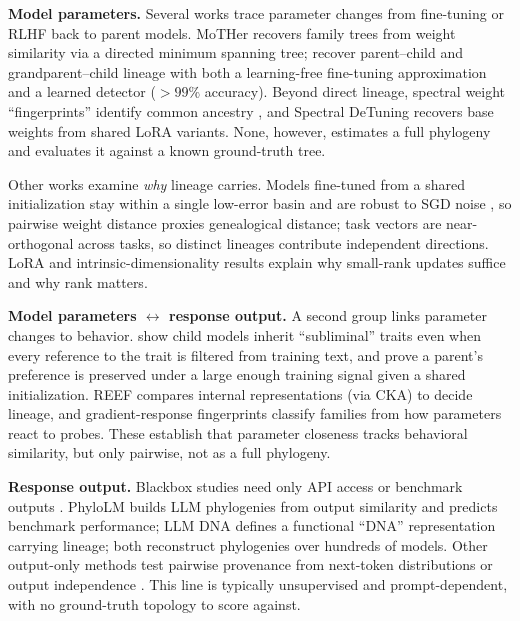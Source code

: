 \documentclass{article}
\theoremstyle{definition}
\theoremstyle{plain}
\begin{document}
\textbf{Model parameters.} Several works trace parameter changes from fine-tuning or RLHF back to parent models. MoTHer
\citep{horwitz2025mother} recovers family trees from weight similarity via a directed minimum spanning
tree; \citet{yu2025neural} recover parent--child and grandparent--child lineage with both a
learning-free fine-tuning approximation and a learned detector ($>99\%$ accuracy). Beyond direct
lineage, spectral weight ``fingerprints'' identify common ancestry \citep{ghostspec2025}, and Spectral
DeTuning \citep{horwitz2024spectral} recovers base weights from shared LoRA variants. None, however,
estimates a full phylogeny and evaluates it against a known ground-truth tree.

Other works examine \emph{why} lineage carries. Models fine-tuned from a shared initialization stay
within a single low-error basin and are robust to SGD noise
\citep{neyshabur2020,wortsman2022model,frankle2020linear}, so pairwise weight distance proxies
genealogical distance; task vectors \citep{ilharco2023editing} are near-orthogonal across tasks, so
distinct lineages contribute independent directions. LoRA \citep{hu2022lora} and intrinsic-dimensionality
results \citep{aghajanyan2021intrinsic} explain why small-rank updates suffice and why rank matters.

\textbf{Model parameters $\leftrightarrow$ response output.} A second group links parameter changes to
behavior. \citet{cloud2025subliminal} show child models inherit ``subliminal'' traits even when every
reference to the trait is filtered from training text, and prove a parent's preference is preserved
under a large enough training signal given a shared initialization. REEF \citep{zhang2025reef} compares
internal representations (via CKA) to decide lineage, and gradient-response fingerprints
\citep{tensorguard2025} classify families from how parameters react to probes. These establish that
parameter closeness tracks behavioral similarity, but only pairwise, not as a full phylogeny.

\textbf{Response output.} Blackbox studies need only API access or benchmark outputs
\citep{yax2025phylolm, wu2026llmdna}. PhyloLM \citep{yax2025phylolm} builds LLM phylogenies from output
similarity and predicts benchmark performance; LLM DNA \citep{wu2026llmdna} defines a functional
``DNA'' representation carrying lineage; both reconstruct phylogenies over hundreds of models. Other
output-only methods test pairwise provenance from next-token distributions \citep{nikolic2026model} or
output independence \citep{zhu2025independence}. This line is typically unsupervised and prompt-dependent,
with no ground-truth topology to score against.
\end{document}

